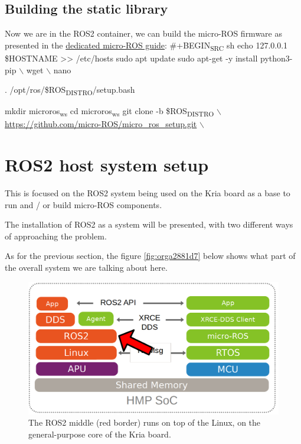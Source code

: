 \documentclass[10pt]{article}
\begin{document}
\subsection{Building the static library}
\label{sec:org0e05275}
Now we are in the ROS2 container, we can build the micro-ROS firmware as presented
in the \href{https://micro.ros.org/docs/tutorials/advanced/create\\\_custom\\\_static\\\_library}{dedicated micro-ROS guide}:
\#+BEGIN\textsubscript{SRC} sh
echo 127.0.0.1 \$HOSTNAME >> /etc/hosts
sudo apt update 
sudo apt-get -y install python3-pip $\backslash$
     wget $\backslash$
     nano

. /opt/ros/\$ROS\textsubscript{DISTRO}/setup.bash

mkdir microros\textsubscript{ws}
cd microros\textsubscript{ws}
git clone -b \$ROS\textsubscript{DISTRO} $\backslash$
    \url{https://github.com/micro-ROS/micro\_ros\_setup.git} $\backslash$
\clearpage
\section{ROS2 host system setup}
\label{sec:orgd497d3c}
This is focused on the ROS2 system being used on the Kria board as a base to run and / or build
micro-ROS components.

The installation of ROS2 as a system will be presented, with
two different ways of approaching the problem.

As for the previous section, the figure \ref{fig:orga2881d7} below shows what part
of the overall system we are talking about here.

\begin{figure}[htbp]
\centering
\includegraphics[width=.6\textwidth]{./img/map_ros.png}
\caption{\label{fig:orgb3b6ead}The ROS2 middle (red border) runs on top of the Linux, on the general-purpose core of the Kria board.}
\end{figure}
\end{document}
